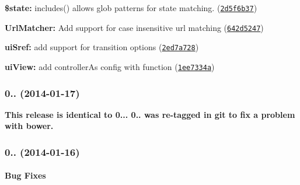 {\bfseries {\bfseries {\bfseries {\bfseries {\bfseries }}}}}

{\bfseries {\bfseries {\bfseries {\bfseries {\bfseries 
\begin{DoxyItemize}
\item {\bfseries \$state\+:} includes() allows glob patterns for state matching. (\href{https://github.com/angular-ui/ui-router/commit/2d5f6b37191a3135f4a6d9e8f344c54edcdc065b}{\tt 2d5f6b37})
\item {\bfseries Url\+Matcher\+:} Add support for case insensitive url matching (\href{https://github.com/angular-ui/ui-router/commit/642d524799f604811e680331002feec7199a1fb5}{\tt 642d5247})
\item {\bfseries ui\+Sref\+:} add support for transition options (\href{https://github.com/angular-ui/ui-router/commit/2ed7a728cee6854b38501fbc1df6139d3de5b28a}{\tt 2ed7a728})
\item {\bfseries ui\+View\+:} add controller\+As config with function (\href{https://github.com/angular-ui/ui-router/commit/1ee7334a73efeccc9b95340e315cdfd59944762d}{\tt 1ee7334a})
\end{DoxyItemize}}}}}}

{\bfseries {\bfseries {\bfseries {\bfseries {\bfseries \subsubsection*{0.. (2014-\/01-\/17)}}}}}}

{\bfseries {\bfseries {\bfseries {\bfseries {\bfseries }}}}}

{\bfseries {\bfseries {\bfseries {\bfseries {\bfseries This release is identical to 0... 0.. was re-\/tagged in git to fix a problem with bower.}}}}}

{\bfseries {\bfseries {\bfseries {\bfseries {\bfseries \subsubsection*{0.. (2014-\/01-\/16)}}}}}}

{\bfseries {\bfseries {\bfseries {\bfseries {\bfseries }}}}}

{\bfseries {\bfseries {\bfseries {\bfseries {\bfseries \paragraph*{Bug Fixes}}}}}}

{\bfseries {\bfseries {\bfseries {\bfseries {\bfseries }}}}}

